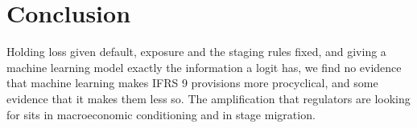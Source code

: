 \documentclass[11pt]{article}
\begin{document}
\section{Conclusion}
Holding loss given default, exposure and the staging rules fixed, and giving a machine learning model exactly the
information a logit has, we find no evidence that machine learning makes IFRS 9 provisions more procyclical, and
some evidence that it makes them less so. The amplification that regulators are looking for sits in macroeconomic
conditioning and in stage migration.



\end{document}
